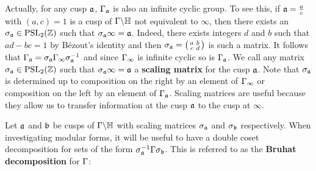       Actually, for any cusp $\mathfrak{a}$, $\Gamma_{\mathfrak{a}}$ is also an infinite cyclic group. To see this, if $\mathfrak{a} = \frac{a}{c}$ with $(a,c) = 1$ is a cusp of $\Gamma\backslash\mathbb{H}$ not equivalent to $\infty$, then there exists an $\sigma_{\mathfrak{a}} \in \mathrm{PSL}_{2}(\mathbb{Z})$ such that $\sigma_{\mathfrak{a}}\infty = \mathfrak{a}$. Indeed, there exists integers $d$ and $b$ such that $ad-bc = 1$ by B\'ezout's identity and then $\sigma_{\mathfrak{a}} = \begin{psmallmatrix} a & b \\ c & d \end{psmallmatrix}$ is such a matrix. It follows that $\Gamma_{\mathfrak{a}} = \sigma_{\mathfrak{a}}\Gamma_{\infty}\sigma_{\mathfrak{a}}^{-1}$ and since $\Gamma_{\infty}$ is infinite cyclic so is $\Gamma_{\mathfrak{a}}$. We call any matrix $\sigma_{\mathfrak{a}} \in \mathrm{PSL}_{2}(\mathbb{Z})$ such that $\sigma_{\mathfrak{a}}\infty = \mathfrak{a}$ a \textbf{scaling matrix} for the cusp $\mathfrak{a}$. Note that $\sigma_{\mathfrak{a}}$ is determined up to composition on the right by an element of $\Gamma_{\infty}$ or composition on the left by an element of $\Gamma_{\mathfrak{a}}$. Scaling matrices are useful because they allow us to transfer information at the cusp $\mathfrak{a}$ to the cusp at $\infty$. 

      Let $\mathfrak{a}$ and $\mathfrak{b}$ be cusps of $\Gamma\backslash\mathbb{H}$ with scaling matrices $\sigma_{\mathfrak{a}}$ and $\sigma_{\mathfrak{b}}$ respectively. When investigating modular forms, it will be useful to have a double coset decomposition for sets of the form $\sigma_{\mathfrak{a}}^{-1}\Gamma\sigma_{\mathfrak{b}}$. This is referred to as the \textbf{Bruhat decomposition} for $\Gamma$:

